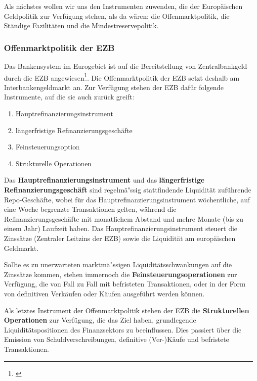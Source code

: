 \documentclass[
  onecolumn,
  a4paper,
  abstracton,
  parskip=half
  ,final
  ]{scrartcl}
\begin{document}
Als n{\"a}chstes wollen wir uns den Instrumenten zuwenden, die der Europ{\"a}ischen Geldpolitik zur Verf{\"u}gung stehen, als da w{\"a}ren: die Offenmarktpolitik, die St{\"a}ndige Fazilit{\"a}ten und die Mindestreservepolitik.

\subsubsection{Offenmarktpolitik der EZB}
Das Bankensystem im Eurogebiet ist auf die Bereitstellung von Zentralbankgeld durch die EZB angewiesen\footnote[53]{\citep[vgl.][S.558f]{Basseler2010}}. Die Offenmarktpolitik der EZB setzt deshalb am Interbankengeldmarkt an. Zur Verf{\"u}gung stehen der EZB daf{\"u}r folgende Instrumente, auf die sie auch zur{\"u}ck greift:
\begin{enumerate}
 \item{Hauptrefinanzierungsinstrument}
 \item{l{\"a}ngerfristige Refinanzierungsgesch{\"a}fte}
 \item{Feinsteuerungsoption}
 \item{Strukturelle Operationen}
 \end{enumerate}










Das \textbf{Hauptrefinanzierungsinstrument} und das \textbf{l{\"a}ngerfristige Refinanzierungsgesch{\"a}ft} sind regelm{\"a}{"ss}ig stattfindende Liquidit{\"a}t zuf{\"u}hrende Repo-Gesch{\"a}fte, wobei f{\"u}r das Hauptrefinanzierungsinstrument w{\"o}chentliche, auf eine Woche begrenzte Transaktionen gelten, w{\"a}hrend die Refinanzierungsgesch{\"a}fte mit monatlichem Abstand und mehre Monate (bis zu einem Jahr) Laufzeit haben. Das Hauptrefinanzierungsinstrument steuert die Zinss{\"a}tze (Zentraler Leitzins der EZB) sowie die Liquidit{\"a}t am europ{\"a}ischen Geldmarkt.

Sollte es zu unerwarteten marktm{\"a}{"ss}igen Liquidit{\"a}tsschwankungen auf die Zinss{\"a}tze kommen, stehen immernoch die \textbf{Feinsteuerungsoperationen} zur Verf{\"u}gung, die von Fall zu Fall mit befristeten Transaktionen, oder in der Form von definitiven Verk{\"a}ufen oder K{\"a}ufen ausgef{\"u}hrt werden k{\"o}nnen.


Als letztes Instrument der Offenmarktpolitik stehen der EZB die \textbf{Strukturellen Operationen} zur Verf{\"u}gung, die das Ziel haben, grundlegende Liquidit{\"a}tspositionen des Finanzsektors zu beeinflussen. Dies passiert {\"u}ber die Emission von Schuldverschreibungen, definitive (Ver-)K{\"a}ufe und befristete Transaktionen.
\end{document}
